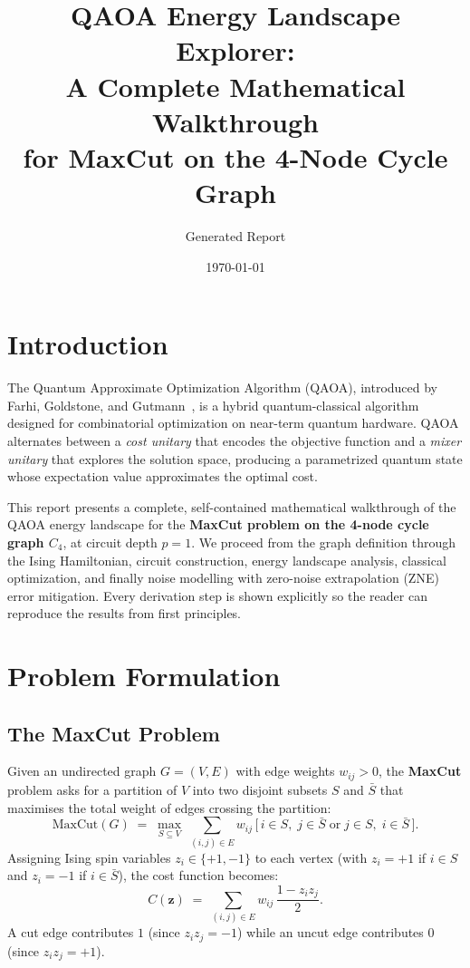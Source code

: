 \documentclass[11pt,a4paper]{article}
\title{QAOA Energy Landscape Explorer:\\
  A Complete Mathematical Walkthrough\\
  for MaxCut on the 4-Node Cycle Graph}
\author{Generated Report}
\date{\today}
\begin{document}
\maketitle
\tableofcontents
\newpage

\section{Introduction}\label{sec:introduction}

The Quantum Approximate Optimization Algorithm (QAOA), introduced by Farhi,
Goldstone, and Gutmann~\cite{farhi2014}, is a hybrid quantum-classical
algorithm designed for combinatorial optimization on near-term quantum
hardware.  QAOA alternates between a \emph{cost unitary} that encodes the
objective function and a \emph{mixer unitary} that explores the solution space,
producing a parametrized quantum state whose expectation value approximates the
optimal cost.

This report presents a complete, self-contained mathematical walkthrough of the
QAOA energy landscape for the \textbf{MaxCut problem on the 4-node cycle graph
$C_4$}, at circuit depth $p=1$.  We proceed from the graph definition through
the Ising Hamiltonian, circuit construction, energy landscape analysis,
classical optimization, and finally noise modelling with zero-noise
extrapolation (ZNE) error mitigation.  Every derivation step is shown
explicitly so the reader can reproduce the results from first principles.

\section{Problem Formulation}\label{sec:problem}

\subsection{The MaxCut Problem}

Given an undirected graph $G=(V,E)$ with edge weights $w_{ij}>0$, the
\textbf{MaxCut} problem asks for a partition of $V$ into two disjoint subsets
$S$ and $\bar{S}$ that maximises the total weight of edges crossing the
partition:
\begin{equation}\label{eq:maxcut-obj}
  \text{MaxCut}(G) \;=\; \max_{S \subseteq V}\; \sum_{(i,j)\in E} w_{ij}\,
    \bigl[\, i\in S,\; j\in\bar{S} \;\text{or}\; j\in S,\; i\in\bar{S}\,\bigr].
\end{equation}
Assigning Ising spin variables $z_i \in \{+1,-1\}$ to each vertex (with $z_i =
+1$ if $i\in S$ and $z_i = -1$ if $i\in\bar{S}$), the cost function becomes:
\begin{equation}\label{eq:cost-ising}
  C(\mathbf{z}) \;=\; \sum_{(i,j)\in E} w_{ij}\,\frac{1 - z_i z_j}{2}.
\end{equation}
A cut edge contributes $1$ (since $z_i z_j = -1$) while an uncut edge
contributes $0$ (since $z_i z_j = +1$).
\end{document}
